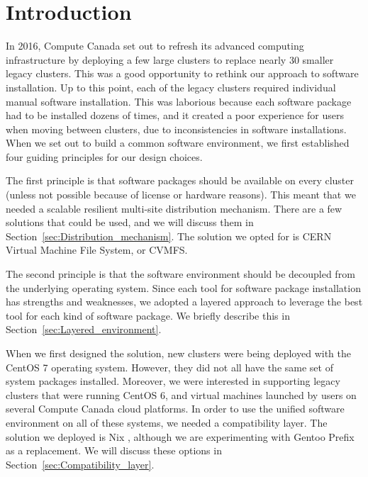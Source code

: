 \documentclass[sigconf]{acmart}
\begin{document}
%
\maketitle

\section{Introduction}
\label{sec:Introduction}
In 2016, Compute Canada set out to refresh its advanced computing infrastructure by deploying a few large clusters to replace nearly 30 smaller legacy clusters. This was a good opportunity to rethink our approach to software installation. Up to this point, each of the legacy clusters required individual manual software installation. This was laborious because each software package had to be installed dozens of times, and it created a poor experience for users when moving between clusters, due to inconsistencies in software installations. When we set out to build a common software environment, we first established four guiding principles for our design choices.

The first principle is that software packages should be available on every cluster (unless not possible because of license or hardware reasons). This meant that we needed a scalable resilient multi-site distribution mechanism. There are a few solutions that could be used, and we will discuss them in Section~\ref{sec:Distribution_mechanism}. The solution we opted for is CERN Virtual Machine File System, or CVMFS\cite{CVMFS}.

The second principle is that the software environment should be decoupled from the underlying operating system. Since each tool for software package installation has strengths and weaknesses, we adopted a layered approach to leverage the best tool for each kind of software package. We briefly describe this in Section~\ref{sec:Layered_environment}.

When we first designed the solution, new clusters were being deployed with the CentOS 7 operating system. However, they did not all have the same set of system packages installed. Moreover, we were interested in supporting legacy clusters
that were running CentOS 6, and virtual machines launched by users on several Compute Canada cloud platforms. In order to use the unified software environment on all of these systems, we needed a compatibility layer. 
The solution we deployed is Nix \cite{Nix}, although we are experimenting with Gentoo Prefix \cite{Gentoo} as a replacement. We will discuss these options in Section~\ref{sec:Compatibility_layer}.
\end{document}
